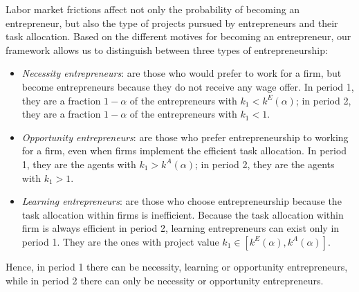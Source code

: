 \documentclass[12pt,american]{paper}
\theoremstyle{remark}
\begin{document}
Labor market frictions affect not only the probability of becoming an entrepreneur, but also the type of projects pursued by entrepreneurs and their task allocation. Based on the different motives for becoming an entrepreneur, our framework allows us to distinguish between three types of entrepreneurship: 
\begin{itemize}
\item \textit{Necessity entrepreneurs}: are those who would prefer to work for a firm, but become entrepreneurs because they do not receive any wage offer. In period 1, they are a fraction $1-\alpha$ of the entrepreneurs with $k_1 < k^E(\alpha)$; in period 2, they are a fraction $1-\alpha$ of the entrepreneurs with $k_1 < 1$.
 \item \textit{Opportunity entrepreneurs}: are those who prefer entrepreneurship to working for a firm, even when firms implement the efficient task allocation. In period 1, they are the agents with $k_1>k^A(\alpha)$; in period 2, they are the agents with $k_1>1$.
   \item \textit{Learning entrepreneurs}: are those who choose entrepreneurship because the task allocation within firms is inefficient. Because the task allocation within firm is always efficient in period 2, learning entrepreneurs can exist only in period 1. They are the ones with project value $k_1\in[k^E(\alpha),k^A(\alpha)]$.
  
\end{itemize}
Hence, in period 1 there can be necessity, learning or opportunity entrepreneurs, while in period 2 there can only be necessity or opportunity entrepreneurs.
\end{document}
